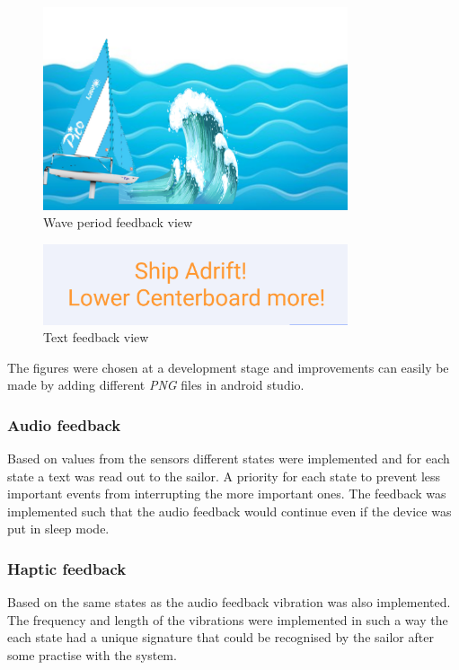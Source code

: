 \begin{figure}[H]
\centering
\includegraphics[width=0.8\textwidth]{Figures/wave.png}
\caption{Wave period feedback view}
\label{feedback-wave}
\end{figure}
\begin{figure}[H]
\centering
\includegraphics[width=0.8\textwidth]{Figures/text.png}
\caption{Text feedback view}
\label{feedback-text}
\end{figure}
The figures were chosen at a development stage and improvements can easily be made by adding different \textit{PNG}\cite{png} files in android studio.

\subsubsection{Audio feedback}
Based on values from the sensors different states were implemented and for each state a text was read out to the sailor. A priority for each state to prevent less important events from interrupting the more important ones. The feedback was implemented such that the audio feedback would continue even if the device was put in sleep mode.

\subsubsection{Haptic feedback}
Based on the same states as the audio feedback vibration was also implemented. The frequency and length of the vibrations were implemented in such a way the each state had a unique signature that could be recognised by the sailor after some practise with the system.

